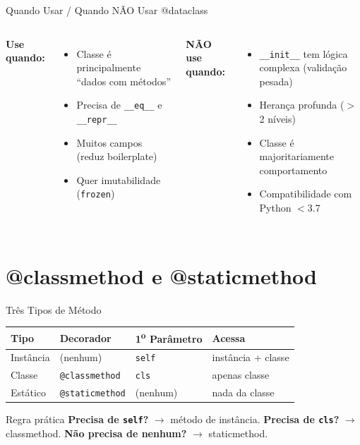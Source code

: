 \documentclass[aspectratio=169]{beamer}
\begin{document}
\begin{frame}{Quando Usar / Quando NÃO Usar @dataclass}
\begin{columns}[T]
\textbf{Use quando:}
\begin{itemize}
  \item Classe é principalmente ``dados com métodos''
  \item Precisa de \texttt{\_\_eq\_\_} e \texttt{\_\_repr\_\_}
  \item Muitos campos (reduz boilerplate)
  \item Quer imutabilidade (\texttt{frozen})
\end{itemize}

\textbf{NÃO use quando:}
\begin{itemize}
  \item \texttt{\_\_init\_\_} tem lógica complexa (validação pesada)
  \item Herança profunda ($>$2 níveis)
  \item Classe é majoritariamente comportamento
  \item Compatibilidade com Python $<$3.7
\end{itemize}
\end{columns}
\end{frame}

\section{@classmethod e @staticmethod}

\begin{frame}[shrink=5]{Três Tipos de Método}
\begin{table}
\centering
\begin{tabular}{llll}
\toprule
\textbf{Tipo} & \textbf{Decorador} & \textbf{1\textsuperscript{o} Parâmetro} & \textbf{Acessa} \\
\midrule
Instância   & (nenhum)          & \texttt{self} & instância + classe \\
Classe      & \texttt{@classmethod}  & \texttt{cls}  & apenas classe \\
Estático    & \texttt{@staticmethod} & (nenhum)      & nada da classe \\
\bottomrule
\end{tabular}
\end{table}

\begin{exampleblock}{Regra prática}
\textbf{Precisa de \texttt{self}?} $\to$ método de instância.
\textbf{Precisa de \texttt{cls}?} $\to$ classmethod.
\textbf{Não precisa de nenhum?} $\to$ staticmethod.
\end{exampleblock}
\end{frame}
\end{document}
